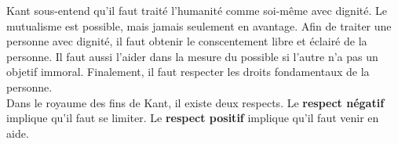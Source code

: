\documentclass[11pt]{article}
\begin{document}


Kant sous-entend qu'il faut traité l'humanité comme soi-même avec dignité. Le mutualisme est possible, mais jamais seulement en avantage. Afin de traiter une personne avec dignité, il faut obtenir le conscentement libre et éclairé de la personne. Il faut aussi l'aider dans la mesure du possible si l'autre n'a pas un objetif immoral. Finalement, il faut respecter les droits fondamentaux de la personne.\\

Dans le royaume des fins de Kant, il existe deux respects. Le \textbf{respect négatif} implique qu'il faut se limiter.  Le \textbf{respect positif} implique qu'il faut venir en aide. 
\end{document}

